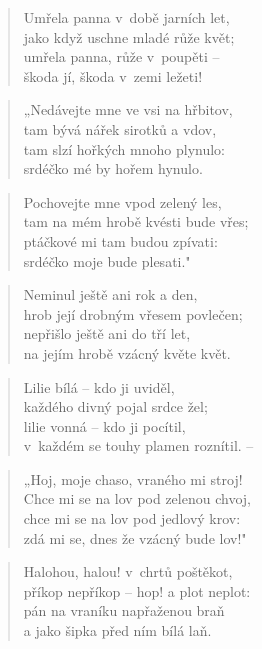 
\begin{verse}
Umřela panna v~době jarních let, \\
jako když uschne mladé růže květ; \\
umřela panna, růže v~poupěti -- \\
škoda jí, škoda v~zemi ležeti!
\end{verse}

\begin{verse}
„Nedávejte mne ve vsi na hřbitov, \\
tam bývá nářek sirotků a vdov, \\
tam slzí hořkých mnoho plynulo: \\
srdéčko mé by hořem hynulo.
\end{verse}

\begin{verse}
Pochovejte mne vpod zelený les, \\
tam na mém hrobě kvésti bude vřes; \\
ptáčkové mi tam budou zpívati: \\
srdéčko moje bude plesati."
\end{verse}

\begin{verse}
Neminul ještě ani rok a den, \\
hrob její drobným vřesem povlečen; \\
nepřišlo ještě ani do tří let, \\
na jejím hrobě vzácný květe květ.
\end{verse}

\begin{verse}
Lilie bílá -- kdo ji uviděl, \\
každého divný pojal srdce žel; \\
lilie vonná -- kdo ji pocítil, \\
v~každém se touhy plamen roznítil. --
\end{verse}

\begin{verse}
„Hoj, moje chaso, vraného mi stroj! \\
Chce mi se na lov pod zelenou chvoj, \\
chce mi se na lov pod jedlový krov: \\
zdá mi se, dnes že vzácný bude lov!"
\end{verse}

\begin{verse}
Halohou, halou! v~chrtů poštěkot, \\
příkop nepříkop -- hop! a plot neplot: \\
pán na vraníku napřaženou braň \\
a jako šipka před ním bílá laň.
\end{verse}

